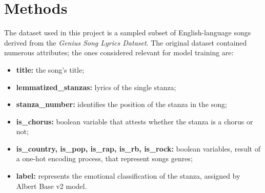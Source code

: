 \chapter*{Methods}
\label{ch:capitolo2}


The dataset used in this project is a sampled subset of English-language
songs derived from the \textit{Genius Song Lyrics Dataset}\textsuperscript{\cite{geniusdataset}}.
The original dataset contained numerous attributes; the ones considered
relevant for model training are:
\begin{itemize}
    \item \textbf{title:} the song's title;

    \item \textbf{lemmatized\_stanzas:} lyrics of the single stanza;
    
    \item \textbf{stanza\_number:} identifies the position of the stanza in the song;

    \item \textbf{is\_chorus:} boolean variable that attests whether the stanza is
        a chorus or not;
    
    \item \textbf{is\_country, is\_pop, is\_rap, is\_rb, is\_rock:} boolean variables, result of a one-hot encoding process, that represent songs genres;

    \item \textbf{label:} represents the emotional classification of the stanza,
        assigned by Albert Base v2\textsuperscript{\cite{albert-base-v2}} model.
    
\end{itemize}

